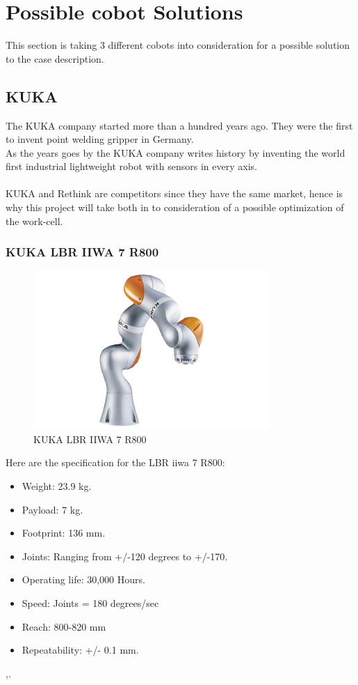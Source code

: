 
\section{Possible cobot Solutions} \label{ch:UR}

This section is taking 3 different cobots into consideration for a possible solution to the case description.

\subsection{KUKA}

The KUKA company started more than a hundred years ago. They were the first to invent point welding gripper in Germany.\\
As the years goes by the KUKA company writes history by inventing the world first industrial lightweight robot with sensors in every axis.\\
\\
KUKA and Rethink are competitors since they have the same market, hence is why this project will take both in to consideration of a possible optimization of the work-cell\cite{KukaHist}.\\


\subsubsection{KUKA LBR IIWA 7 R800}
\begin{figure}[H]
    \centering
    \includegraphics[width=9cm]{UR/1502895088_1.png}
    \caption{KUKA LBR IIWA 7 R800 \cite{KUKAbillede}}
    \label{fig:LBR IIWA}
\end{figure}

Here are the specification for the LBR iiwa 7 R800:\\

\begin{itemize}
    \item Weight: 23.9 kg.
    \item Payload: 7 kg.
    \item Footprint: 136 mm.
    \item Joints: Ranging from +/-120 degrees to +/-170.
    \item Operating life: 30,000 Hours.
    \item Speed: Joints = 180 degrees/sec
    \item Reach: 800-820 mm
    \item Repeatability: +/- 0.1 mm.
\end{itemize}
\cite{KukaSpec1},\cite{KukaSpec2}.

